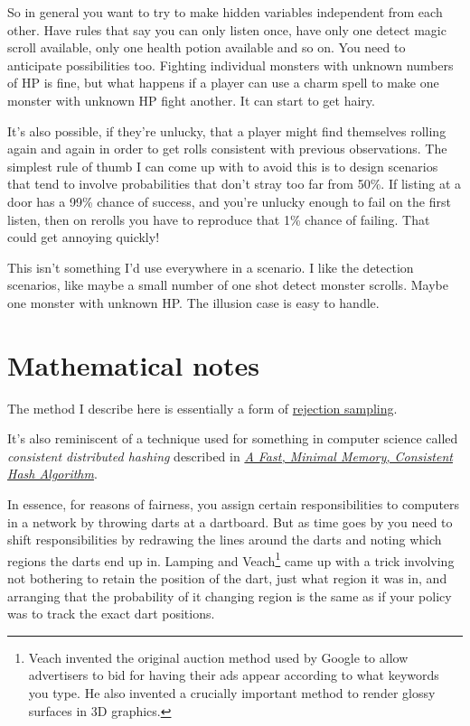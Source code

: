 \documentclass[12pt]{article}
\begin{document}
So in general you want to try to make hidden variables independent from
each other. Have rules that say you can only listen once, have only one
detect magic scroll available, only one health potion available and so
on. You need to anticipate possibilities too. Fighting individual
monsters with unknown numbers of HP is fine, but what happens if a
player can use a charm spell to make one monster with unknown HP fight
another. It can start to get hairy.

It's also possible, if they're unlucky, that a player might find
themselves rolling again and again in order to get rolls consistent with
previous observations. The simplest rule of thumb I can come up with to
avoid this is to design scenarios that tend to involve probabilities
that don't stray too far from 50\%. If listing at a door has a 99\%
chance of success, and you're unlucky enough to fail on the first
listen, then on rerolls you have to reproduce that 1\% chance of
failing. That could get annoying quickly!

This isn't something I'd use everywhere in a scenario. I like the
detection scenarios, like maybe a small number of one shot detect
monster scrolls. Maybe one monster with unknown HP. The illusion case is
easy to handle.
\fi

\hypertarget{mathematical-notes}{
\section{Mathematical notes}}
\label{mathematical-notes}

The method I describe here is essentially a form of \href{https://en.wikipedia.org/wiki/Rejection_sampling}{rejection sampling}.

It's also reminiscent of a technique used for something in computer
science called \emph{consistent distributed hashing} described in
\href{https://arxiv.org/abs/1406.2294}{{\em A Fast, Minimal Memory, Consistent Hash Algorithm}}.

In essence, for reasons of fairness, you
assign certain responsibilities to computers in a network by throwing
darts at a dartboard.
But as time goes by you need to shift
responsibilities by redrawing the lines around the darts and noting
which regions the darts end up in. Lamping and Veach\footnote{
  Veach invented the original auction method used by Google to allow advertisers to bid
  for having their ads appear according to what keywords you type. He
  also invented a crucially important method to render glossy surfaces
  in 3D graphics.} came up with a trick involving not bothering to
retain the position of the dart, just what region it was in, and
arranging that the probability of it changing region is the same as if
your policy was to track the exact dart positions.
\end{document}
